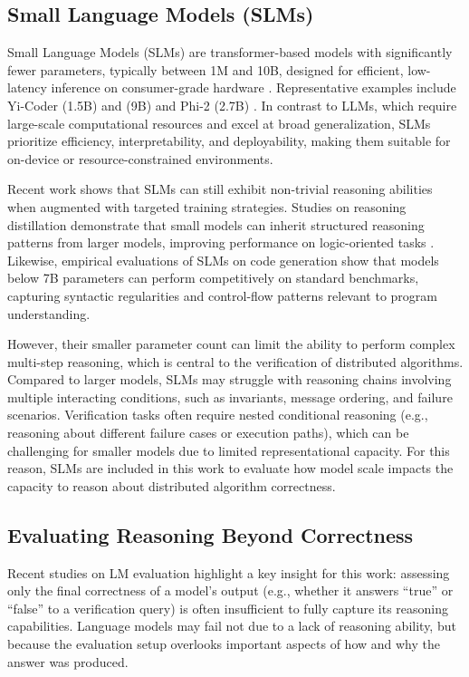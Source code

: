 \subsection{Small Language Models (SLMs)}
Small Language Models (SLMs) are transformer-based models with significantly fewer parameters, typically between 1M and 10B, designed for efficient, low-latency inference on consumer-grade hardware \cite{belcak2024slm,magister2024}. Representative examples include Yi-Coder (1.5B) and (9B) \cite{yi2024coder} and Phi-2 (2.7B) \cite{phi2}. In contrast to LLMs, which require large-scale computational resources and excel at broad generalization, SLMs prioritize efficiency, interpretability, and deployability, making them suitable for on-device or resource-constrained environments\cite{huggingfaceSLM}.

Recent work shows that SLMs can still exhibit non-trivial reasoning abilities when augmented with targeted training strategies. Studies on reasoning distillation demonstrate that small models can inherit structured reasoning patterns from larger models, improving performance on logic-oriented tasks \cite{magister2024}. Likewise, empirical evaluations of SLMs on code generation \cite{hasana2024slmcode} show that models below 7B parameters can perform competitively on standard benchmarks, capturing syntactic regularities and control-flow patterns relevant to program understanding.

However, their smaller parameter count can limit the ability to perform complex multi-step reasoning, which is central to the verification of distributed algorithms. Compared to larger models, SLMs may struggle with reasoning chains involving multiple interacting conditions, such as invariants, message ordering, and failure scenarios. Verification tasks often require nested conditional reasoning (e.g., reasoning about different failure cases or execution paths), which can be challenging for smaller models due to limited representational capacity. For this reason, SLMs are included in this work to evaluate how model scale impacts the capacity to reason about distributed algorithm correctness.

\subsection{Evaluating Reasoning Beyond Correctness}
Recent studies on LM evaluation\cite{shojaee2024illusion,lawsen2024illusion2} highlight a key insight for this work: assessing only the final correctness of a model’s output (e.g., whether it answers “true” or “false” to a verification query) is often insufficient to fully capture its reasoning capabilities. Language models may fail not due to a lack of reasoning ability, but because the evaluation setup overlooks important aspects of how and why the answer was produced.


